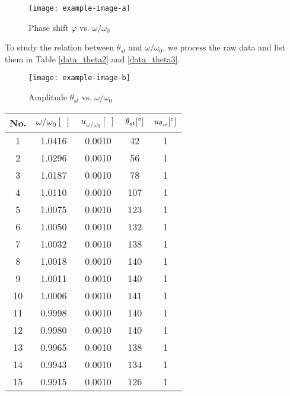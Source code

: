     \begin{figure}[H]
    \centering
        \texttt{[image: example-image-a]}
        \caption{Phase shift $\varphi$ vs. $\omega/\omega_0$}\label{phi}
    \end{figure}


    To study the relation between $\theta_{st}$ and $\omega/\omega_0$, we process the raw data and list them in Table \ref{data_theta2} and \ref{data_theta3}.


    \begin{figure}[H]
    \centering
        \texttt{[image: example-image-b]}
        \caption{Amplitude $\theta_{st}$ vs. $\omega/\omega_0$}\label{theta}
    \end{figure}

        \begin{table}[H]
        \centering
            \begin{tabular}{|c|c|c|c|c|}
                \hline
                No. & $\omega/\omega_0[\ ]$ & $u_{\omega/\omega_0}[\ ]$ & $\theta_{st}[^\circ]$ & $u_{\theta_{st}}[^\circ]$\\\hline
                1 & 1.0416 & 0.0010 & 42 & 1\\\hline
                2 & 1.0296 & 0.0010 & 56 & 1\\\hline
                3 & 1.0187 & 0.0010 & 78 & 1\\\hline
                4 & 1.0110 & 0.0010 & 107 & 1\\\hline
                5 & 1.0075 & 0.0010 & 123 & 1\\\hline
                6 & 1.0050 & 0.0010 & 132 & 1\\\hline
                7 & 1.0032 & 0.0010 & 138 & 1\\\hline
                8 & 1.0018 & 0.0010 & 140 & 1\\\hline
                9 & 1.0011 & 0.0010 & 140 & 1\\\hline
                10 & 1.0006 & 0.0010 & 141 & 1\\\hline
                11 & 0.9998 & 0.0010 & 140 & 1\\\hline
                12 & 0.9980 & 0.0010 & 140 & 1\\\hline
                13 & 0.9965 & 0.0010 & 138 & 1\\\hline
                14 & 0.9943 & 0.0010 & 134 & 1\\\hline
                15 & 0.9915 & 0.0010 & 126 & 1\\\hline

\end{tabular}
\end{table}
